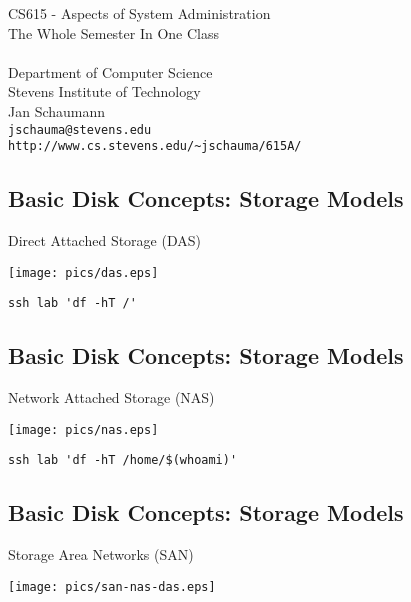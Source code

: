 \documentclass[xga]{xdvislides}
\begin{document}
\setfontphv

\lhead{\slidetitle}				%
\cfoot{\relax}					%
\rfoot{\Gray{\today}}

\vspace*{\fill}
\begin{center}
	\Hugesize
		CS615 - Aspects of System Administration\\ [1em]
		The Whole Semester In One Class\\ [1em]
	\hspace*{5mm}\blueline\\ [1em]
	\Normalsize
		Department of Computer Science\\
		Stevens Institute of Technology\\
		Jan Schaumann\\
		\verb+jschauma@stevens.edu+ \\
		\verb+http://www.cs.stevens.edu/~jschauma/615A/+
\end{center}
\vspace*{\fill}

\subsection{Basic Disk Concepts: Storage Models}
Direct Attached Storage (DAS)
\vfill
\begin{center}
	\texttt{[image: pics/das.eps]} \\
\end{center}
\verb+ssh lab 'df -hT /'+
\vfill

\subsection{Basic Disk Concepts: Storage Models}
Network Attached Storage (NAS)
\vfill
\begin{center}
	\texttt{[image: pics/nas.eps]} \\
\end{center}
\verb+ssh lab 'df -hT /home/$(whoami)'+
\vfill

\subsection{Basic Disk Concepts: Storage Models}
Storage Area Networks (SAN)
\vfill
\begin{center}
	\texttt{[image: pics/san-nas-das.eps]} \\
\end{center}
\vfill
\end{document}
